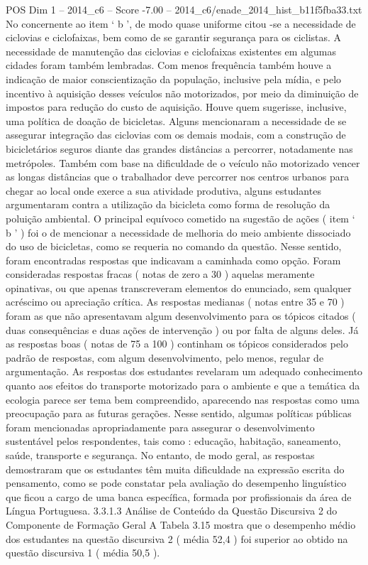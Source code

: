 \begin{textsample}{POS Dim 1 – 2014\_c6 – Score -7.00 – 2014\_c6/enade\_2014\_hist\_b11f5fba33.txt}
No concernente ao item ‘ b ’, de modo quase uniforme citou -se a necessidade de ciclovias e ciclofaixas, bem como de se garantir segurança para os ciclistas.
A necessidade de manutenção das ciclovias e ciclofaixas existentes em algumas cidades foram também lembradas.
Com menos frequência também houve a indicação de maior conscientização da população, inclusive pela mídia, e pelo incentivo à aquisição desses veículos não motorizados, por meio da diminuição de impostos para redução do custo de aquisição.
Houve quem sugerisse, inclusive, uma política de doação de bicicletas.
Alguns mencionaram a necessidade de se assegurar integração das ciclovias com os demais modais, com a construção de bicicletários seguros diante das grandes distâncias a percorrer, notadamente nas metrópoles.
Também com base na dificuldade de o veículo não motorizado vencer as longas distâncias que o trabalhador deve percorrer nos centros urbanos para chegar ao local onde exerce a sua atividade produtiva, alguns estudantes argumentaram contra a utilização da bicicleta como forma de resolução da poluição ambiental.
O principal equívoco cometido na sugestão de ações ( item ‘ b ’ ) foi o de mencionar a necessidade de melhoria do meio ambiente dissociado do uso de bicicletas, como se requeria no comando da questão.
Nesse sentido, foram encontradas respostas que indicavam a caminhada como opção.
Foram consideradas respostas fracas ( notas de zero a 30 ) aquelas meramente opinativas, ou que apenas transcreveram elementos do enunciado, sem qualquer acréscimo ou apreciação crítica.
As respostas medianas ( notas entre 35 e 70 ) foram as que não apresentavam algum desenvolvimento para os tópicos citados ( duas consequências e duas ações de intervenção ) ou por falta de alguns deles.
Já as respostas boas ( notas de 75 a 100 ) continham os tópicos considerados pelo padrão de respostas, com algum desenvolvimento, pelo menos, regular de argumentação.
As respostas dos estudantes revelaram um adequado conhecimento quanto aos efeitos do transporte motorizado para o ambiente e que a temática da ecologia parece ser tema bem compreendido, aparecendo nas respostas como uma preocupação para as futuras gerações.
Nesse sentido, algumas políticas públicas foram mencionadas apropriadamente para assegurar o desenvolvimento sustentável pelos respondentes, tais como : educação, habitação, saneamento, saúde, transporte e segurança.
No entanto, de modo geral, as respostas demostraram que os estudantes têm muita dificuldade na expressão escrita do pensamento, como se pode constatar pela avaliação do desempenho linguístico que ficou a cargo de uma banca específica, formada por profissionais da área de Língua Portuguesa. 3.3.1.3 Análise de Conteúdo da Questão Discursiva 2 do Componente de Formação Geral A Tabela 3.15 mostra que o desempenho médio dos estudantes na questão discursiva 2 ( média 52,4 ) foi superior ao obtido na questão discursiva 1 ( média 50,5 ).

\end{textsample}
